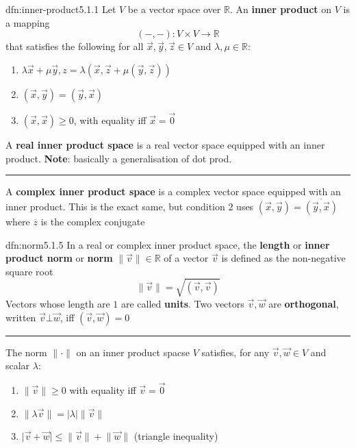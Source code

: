 \documentclass[landscape, 8pt]{extarticle}
\begin{document}
\begin{multicols}{3}
\begin{dfn}{dfn:inner-product}{5.1.1}
    Let $V$ be a vector space over $\mathbb{R}$. An \textbf{inner product} on $V$ is a mapping
    \[(- , - ) : V \times V \to \mathbb{R}\]
    that satisfies the following for all $\vec{x}, \vec{y}, \vec{z}\in V$ and $\lambda,\mu\in \mathbb{R}$:
    \begin{enumerate}
        \setlength\itemsep{0em}
        \item $\lambda\vec{x}+\mu\vec{y},z = \lambda(\vec{x},\vec{z} + \mu(\vec{y},\vec{z}))$
        \item $(\vec{x},\vec{y}) = (\vec{y}, \vec{x})$
        \item $(\vec{x},\vec{x}) \ge 0$, with equality iff $\vec{x} = \vec{0}$
    \end{enumerate}
    A \textbf{real inner product space} is a real vector space equipped with an inner product. \textbf{Note}: basically a generalisation of dot prod.

    \noindent\rule{\textwidth}{0.2pt}
    A \textbf{complex inner product space} is a complex vector space equipped with an inner product. This is the exact same, but condition $2$ uses $(\vec{x},\vec{y}) = \overline{(\vec{y}, \vec{x})}$ where $\overline{z}$ is the complex conjugate
\end{dfn}

\begin{dfn}[Norm]{dfn:norm}{5.1.5}
    In a real or complex inner product space, the \textbf{length} or \textbf{inner product norm} or \textbf{norm} $\lVert \vec{v} \rVert\in \mathbb{R}$ of a vector $\vec{v}$ is defined as the non-negative square root
    \[\lVert \vec{v} \rVert = \sqrt{(\vec{v}, \vec{v})}\]
    Vectors whose length are $1$ are called \textbf{units}. Two vectors $\vec{v}, \vec{w}$ are \textbf{orthogonal}, written $\vec{v} \bot \vec{w}$, iff $(\vec{v}, \vec{w}) = 0$

    \noindent\rule{\textwidth}{0.2pt}
    The norm $\lVert \cdot \rVert$ on an inner product spacse $V$ satisfies, for any $\vec{v}, \vec{w}\in V$ and scalar $\lambda$:
    \begin{enumerate}
        \setlength\itemsep{0em}
        \item $\lVert \vec{v} \rVert \ge 0$ with equality iff $\vec{v} = \vec{0}$
        \item $\lVert \lambda \vec{v} \rVert = \lvert \lambda \rvert \lVert  \vec{v} \rVert$
        \item $\lvert \vec{v} + \vec{w} \rvert \le \lVert \vec{v} \rVert + \lVert \vec{w} \rVert$ (triangle inequality)
    \end{enumerate}
\end{dfn}


\end{multicols}
\end{document}
